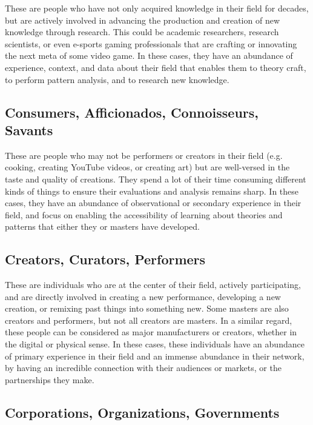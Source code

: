 \documentclass[conference]{IEEEtran}
\begin{document}
These are people who have not only acquired knowledge in their field for decades,
but are actively involved in advancing the production and creation of new 
knowledge through research. This could be academic researchers, research scientists,
or even e-sports gaming professionals that are crafting or innovating the next meta of 
some video game. In these cases, they have an abundance of experience, context, and
data about their field that enables them to theory craft, to perform pattern analysis,
and to research new knowledge.

\subsection{Consumers, Afficionados, Connoisseurs, Savants}

These are people who may not be performers or creators in their field (e.g. cooking,
creating YouTube videos, or creating art) but are well-versed in the taste and 
quality of creations. They spend a lot of their time consuming different kinds of
things to ensure their evaluations and analysis remains sharp. In these cases, 
they have an abundance of observational or secondary experience in their field,
and focus on enabling the accessibility of learning about theories and patterns 
that either they or masters have developed.

\subsection{Creators, Curators, Performers}

These are individuals who are at the center of their field, actively participating,
and are directly involved in creating a new performance, developing a new creation, 
or remixing past things into something new. Some masters are also creators and 
performers, but not all creators are masters. In a similar regard, these people can
be considered as major manufacturers or creators, whether in the digital or physical 
sense. In these cases, these individuals have an abundance of primary experience in
their field and an immense abundance in their network, by having an incredible
connection with their audiences or markets, or the partnerships they make.

\subsection{Corporations, Organizations, Governments}
\end{document}

